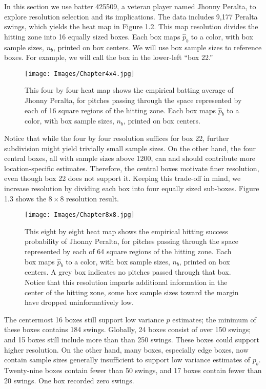 In this section we use batter 425509, a veteran player named Jhonny Peralta, to explore resolution selection and its implications. The data includes 9,177 Peralta swings, which yields the heat map in Figure 1.2. This map resolution divides the hitting zone into 16 equally sized boxes. Each box maps $\hat{p}_{b}$ to a color, with box sample sizes, $n_{b}$, printed on box centers. We will use box sample sizes to reference boxes. For example, we will call the box in the lower-left ``box 22.'' 
        \begin{figure}[H]
      	\centering
      	\texttt{[image: Images/Chapter4x4.jpg]} 
      	\caption{This four by four heat map shows the empirical batting average of Jhonny Peralta, for pitches passing through the space represented by each of 16 square regions of the hitting zone. Each box maps $\hat{p}_{b}$ to a color, with box sample sizes, $n_{b}$, printed on box centers.}
      	\end{figure} 

Notice that while the four by four resolution suffices for box 22, further subdivision might yield trivially small sample sizes. On the other hand, the four central boxes, all with sample sizes above 1200, can and should contribute more location-specific estimates. Therefore, the central boxes motivate finer resolution, even though box 22 does not support it. Keeping this trade-off in mind, we increase resolution by dividing each box into four equally sized sub-boxes. Figure 1.3 shows the $8 \times 8$ resolution result.
        \begin{figure}[H]
      	\centering
      	\texttt{[image: Images/Chapter8x8.jpg]} 
      	\caption{This eight by eight heat map shows the empirical hitting success probability of Jhonny Peralta, for pitches passing through the space represented by each of 64 square regions of the hitting zone. Each box maps $\hat{p}_{b}$ to a color, with box sample sizes, $n_{b}$, printed on box centers. A grey box indicates no pitches passed through that box. Notice that this resolution imparts additional information in the center of the hitting zone, some box sample sizes toward the margin have dropped uninformatively low.}
      	\end{figure} 
The centermost 16 boxes still support low variance $p$ estimates; the minimum of these boxes contains 184 swings. Globally, 24 boxes consist of over 150 swings; and 15 boxes still include more than than 250 swings. These boxes could support higher resolution. On the other hand, many boxes, especially edge boxes, now contain sample sizes generally insufficient to support low variance estimates of $p_{b}$. Twenty-nine boxes contain fewer than 50 swings, and 17 boxes contain fewer than 20 swings. One box recorded zero swings.

